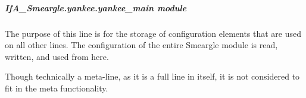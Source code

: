 \documentclass[letterpaper,10pt,english]{sphinxmanual}
\begin{document}
\subparagraph{IfA\_Smeargle.yankee.yankee\_main module}
\label{\detokenize{python_docstrings/IfA_Smeargle.yankee.yankee_main:module-IfA_Smeargle.yankee.yankee_main}}\label{\detokenize{python_docstrings/IfA_Smeargle.yankee.yankee_main:ifa-smeargle-yankee-yankee-main-module}}\label{\detokenize{python_docstrings/IfA_Smeargle.yankee.yankee_main::doc}}
The purpose of this line is for the storage of configuration elements that are used on all
other lines. The configuration of the entire Smeargle module is read, written, and used from
here.

Though technically a meta-line, as it is a full line in itself, it is not considered to fit
in the meta functionality.
\end{document}
